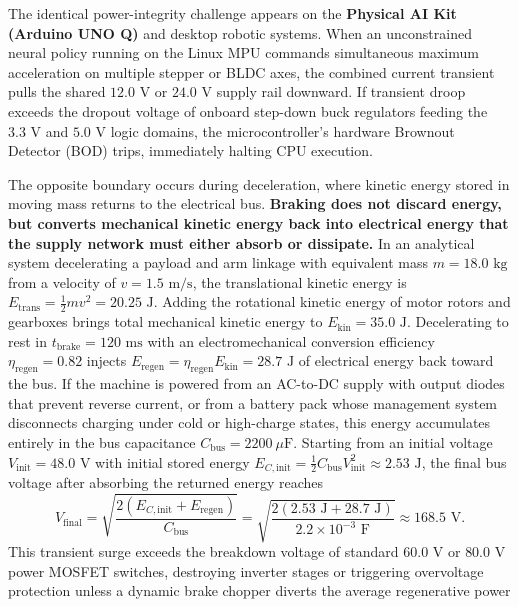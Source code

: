 \documentclass[
  letterpaper,
  DIV=11,
  numbers=noendperiod]{scrartcl}
\begin{document}
The identical power-integrity challenge appears on the \textbf{Physical
AI Kit (Arduino UNO Q)} and desktop robotic systems. When an
unconstrained neural policy running on the Linux MPU commands
simultaneous maximum acceleration on multiple stepper or BLDC axes, the
combined current transient pulls the shared \(12.0\text{ V}\) or
\(24.0\text{ V}\) supply rail downward. If transient droop exceeds the
dropout voltage of onboard step-down buck regulators feeding the
\(3.3\text{ V}\) and \(5.0\text{ V}\) logic domains, the
microcontroller's hardware Brownout Detector (BOD) trips, immediately
halting CPU execution.

The opposite boundary occurs during deceleration, where kinetic energy
stored in moving mass returns to the electrical bus. \textbf{Braking
does not discard energy, but converts mechanical kinetic energy back
into electrical energy that the supply network must either absorb or
dissipate.} In an analytical system decelerating a payload and arm
linkage with equivalent mass \(m = 18.0\text{ kg}\) from a velocity of
\(v = 1.5\text{ m/s}\), the translational kinetic energy is
\(E_{\text{trans}} = \frac{1}{2} m v^2 = 20.25\text{ J}\). Adding the
rotational kinetic energy of motor rotors and gearboxes brings total
mechanical kinetic energy to \(E_{\text{kin}} = 35.0\text{ J}\).
Decelerating to rest in \(t_{\text{brake}} = 120\text{ ms}\) with an
electromechanical conversion efficiency \(\eta_{\text{regen}} = 0.82\)
injects
\(E_{\text{regen}} = \eta_{\text{regen}} E_{\text{kin}} = 28.7\text{ J}\)
of electrical energy back toward the bus. If the machine is powered from
an AC-to-DC supply with output diodes that prevent reverse current, or
from a battery pack whose management system disconnects charging under
cold or high-charge states, this energy accumulates entirely in the bus
capacitance \(C_{\text{bus}} = 2200\ \mu\text{F}\). Starting from an
initial voltage \(V_{\text{init}} = 48.0\text{ V}\) with initial stored
energy
\(E_{C,\text{init}} = \frac{1}{2} C_{\text{bus}} V_{\text{init}}^2 \approx 2.53\text{ J}\),
the final bus voltage after absorbing the returned energy reaches
\[V_{\text{final}} = \sqrt{\frac{2(E_{C,\text{init}} + E_{\text{regen}})}{C_{\text{bus}}}} = \sqrt{\frac{2(2.53\text{ J} + 28.7\text{ J})}{2.2 \times 10^{-3}\text{ F}}} \approx 168.5\text{ V}.\]
This transient surge exceeds the breakdown voltage of standard
\(60.0\text{ V}\) or \(80.0\text{ V}\) power MOSFET switches, destroying
inverter stages or triggering overvoltage protection unless a dynamic
brake chopper diverts the average regenerative power
\end{document}

